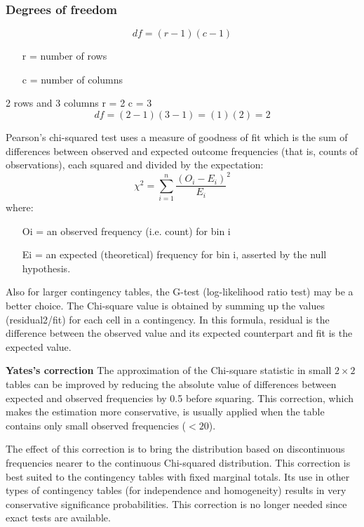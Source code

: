 \documentclass[a4]{beamer}
\begin{document}
\begin{frame}
	\frametitle{Degrees of freedom}
	
	\[df=(r-1)(c-1)\]
	
	\begin{itemize}
		\item[r] = number of rows
		\item[c] = number of columns
	\end{itemize}
	
	2 rows and 3 columns r = 2 c = 3 
	\[df= (2-1)(3-1) = (1)(2) = 2\]
	
	
\end{frame}
\begin{frame}
	
	
	Pearson's chi-squared test uses a measure of goodness of fit which is the sum of differences between observed and expected outcome frequencies (that is, counts of observations), each squared and divided by the expectation:
	\[ \chi^2 = \sum_{i=1}^n {\frac{(O_i - E_i)}{E_i}^2} \]
	where:
	
	\begin{itemize}
		\item[Oi] = an observed frequency (i.e. count) for bin i
		\item[Ei] = an expected (theoretical) frequency for bin i, asserted by the null hypothesis.
	\end{itemize}
\end{frame}

\begin{frame}
	
	Also for larger contingency tables, the G-test (log-likelihood ratio test) may be a better choice. The Chi-square value is obtained by summing up the values (residual2/fit) for each cell in a contingency. In this formula, residual is the difference between the observed value and its expected counterpart and fit is the expected value.
\end{frame}


\begin{frame}
	\noindent \textbf{Yates's correction}
	The approximation of the Chi-square statistic in small $2\times2$ tables can be improved by reducing the absolute value of differences between expected and observed frequencies by 0.5 before squaring. This correction, which makes the estimation more conservative, is usually applied when the table contains only small observed frequencies ($<20$).
	
	The effect of this correction is to bring the distribution based on discontinuous frequencies nearer to the continuous Chi-squared distribution. This correction is best suited to the contingency tables with fixed marginal totals. Its use in other types of contingency tables (for independence and homogeneity) results in very conservative significance probabilities. This correction is no longer needed since exact tests are available.
\end{frame}
\end{document}
